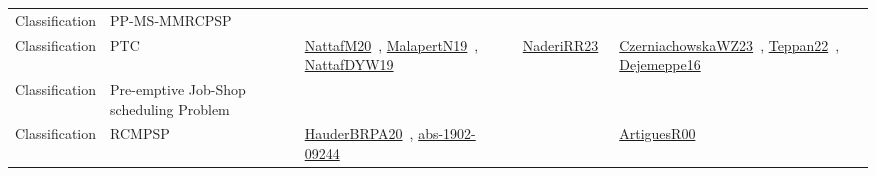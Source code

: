 {\begin{longtable}{lp{3cm}>{\raggedright\arraybackslash}p{6cm}>{\raggedright\arraybackslash}p{6cm}>{\raggedright\arraybackslash}p{8cm}}
Classification & PP-MS-MMRCPSP &  &  & \\
Classification & PTC & \href{../works/NattafM20.pdf}{NattafM20}~\cite{NattafM20}, \href{../works/MalapertN19.pdf}{MalapertN19}~\cite{MalapertN19}, \href{../works/NattafDYW19.pdf}{NattafDYW19}~\cite{NattafDYW19} & \href{../works/NaderiRR23.pdf}{NaderiRR23}~\cite{NaderiRR23} & \href{../works/CzerniachowskaWZ23.pdf}{CzerniachowskaWZ23}~\cite{CzerniachowskaWZ23}, \href{../works/Teppan22.pdf}{Teppan22}~\cite{Teppan22}, \href{../works/Dejemeppe16.pdf}{Dejemeppe16}~\cite{Dejemeppe16}\\
Classification & Pre-emptive Job-Shop scheduling Problem &  &  & \\
Classification & RCMPSP & \href{../works/HauderBRPA20.pdf}{HauderBRPA20}~\cite{HauderBRPA20}, \href{../works/abs-1902-09244.pdf}{abs-1902-09244}~\cite{abs-1902-09244} &  & \href{../works/ArtiguesR00.pdf}{ArtiguesR00}~\cite{ArtiguesR00}\\

\end{longtable}}
